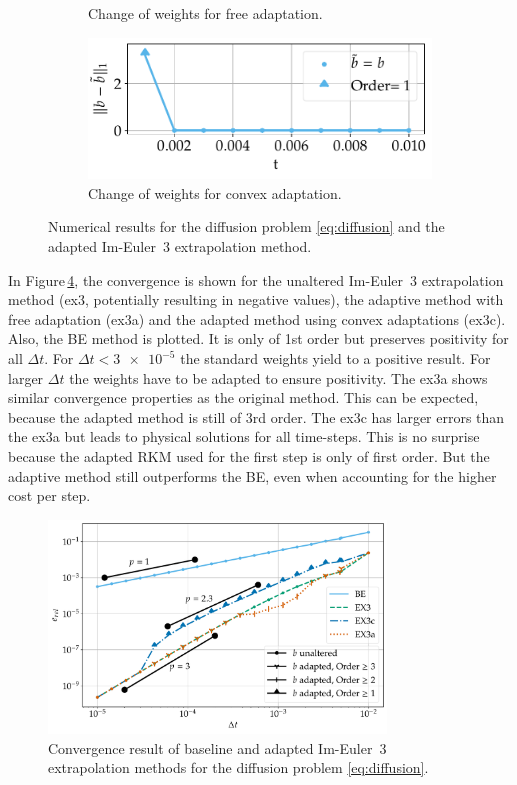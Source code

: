 \documentclass[a4paper]{article}
\numberwithin{equation}{section}
\theoremstyle{plain}
\theoremstyle{definition}
\numberwithin{theorem}{section}
\newcommand{\dt}{{\Delta t}}
\newcommand{\1}{\mathbbm{1}}
\begin{document}
\begin{figure}
\begin{subfigure}[b]{0.45\textwidth}
\caption{Change of weights for free adaptation.}
\label{fig:weights_Diff_a}
\end{subfigure}
\begin{subfigure}[b]{0.45\textwidth}
\centering
\includegraphics[width=1\textwidth]{plots/b_Diff_Convex.pdf}
\caption{Change of weights for convex adaptation.}
\label{fig:weights_Diff_c}
\end{subfigure}
\caption{Numerical results for the diffusion problem \eqref{eq:diffusion} and the
         adapted Im-Euler~3 extrapolation method.}
\end{figure}


In Figure\,\ref{fig:conv_impl}, the convergence is shown for the unaltered Im-Euler~3 extrapolation method (ex3, potentially resulting in negative values), the adaptive method with free adaptation (ex3a) and the adapted method using convex adaptations (ex3c).
Also, the BE method is plotted. It is only of 1st order but preserves positivity for all $\dt$.
For $\dt < \num{3e-5} $ the standard weights yield to a positive result. For larger $\dt$ the weights have to be adapted to ensure positivity.
The ex3a shows similar convergence properties as the original method.
This can be expected, because the adapted method is still of 3rd order.
The ex3c has larger errors than the ex3a but leads to physical solutions for all time-steps.
This is no surprise because the adapted RKM used for the first step is only of first order.
But the adaptive method still outperforms the BE, even when accounting for the higher cost per step.

\begin{figure}[ht]
\centering
\includegraphics[width=0.8\textwidth]{plots/conv_heat.pdf}
\caption{Convergence result of baseline and adapted Im-Euler~3
         extrapolation methods for the diffusion problem \eqref{eq:diffusion}.}
\label{fig:conv_impl}
\end{figure}
\end{document}
